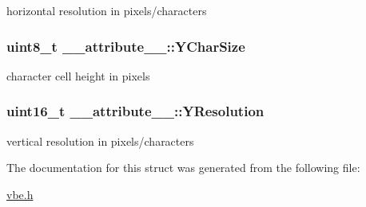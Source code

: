 horizontal resolution in pixels/characters 

\subsubsection[{\texorpdfstring{Y\+Char\+Size}{YCharSize}}]{\setlength{\rightskip}{0pt plus 5cm}uint8\+\_\+t \+\_\+\+\_\+attribute\+\_\+\+\_\+\+::\+Y\+Char\+Size}\hypertarget{struct____attribute_____acb93d86860efea5c87e3c2950f39123e}{}\label{struct____attribute_____acb93d86860efea5c87e3c2950f39123e}


character cell height in pixels 

\subsubsection[{\texorpdfstring{Y\+Resolution}{YResolution}}]{\setlength{\rightskip}{0pt plus 5cm}uint16\+\_\+t \+\_\+\+\_\+attribute\+\_\+\+\_\+\+::\+Y\+Resolution}\hypertarget{struct____attribute_____aa91385451d974d9c33978062e22d39e2}{}\label{struct____attribute_____aa91385451d974d9c33978062e22d39e2}


vertical resolution in pixels/characters 



The documentation for this struct was generated from the following file\+:\begin{DoxyCompactItemize}
\item 
\hyperlink{vbe_8h}{vbe.\+h}\end{DoxyCompactItemize}
